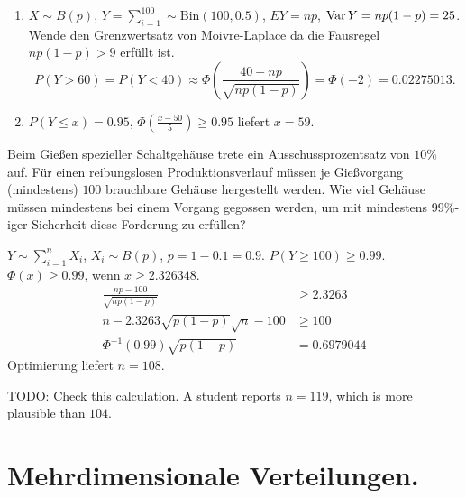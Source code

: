 \solution 
\begin{enumerate}
    \item $X\sim B(p)$, $Y=\sum_{i=1}^{100} \sim \text{Bin}(100,0.5)$, $E Y =
        np$, $\operatorname{Var} Y = np(1-p)= 25$. Wende den Grenzwertsatz von Moivre-Laplace
        da die Fausregel $np(1-p)>9$ erfüllt ist.
        \begin{equation*}
            P(Y>60) = P(Y < 40) \approx 
            \Phi\left( \frac{40 - np}{ \sqrt{np(1-p)}} \right) =
            \Phi(-2) = 0.02275013.
        \end{equation*}

    \item $P(Y \leq x) = 0.95$, $\Phi\left( \frac{x-50}{5} \right) \geq 0.95$
        liefert $x=59$. 
\end{enumerate}

 Beim Gießen spezieller
Schaltgehäuse trete ein Ausschussprozentsatz von $10\%$ auf. Für einen
reibungslosen Produktionsverlauf müssen je Gießvorgang (mindestens) $100$
brauchbare Gehäuse hergestellt werden.  Wie viel Gehäuse müssen mindestens bei
einem Vorgang gegossen werden, um mit mindestens $99\%$-iger Sicherheit diese
Forderung zu erfüllen?

\solution $Y\sim \sum_{i=1}^{n} X_i$, $X_i \sim B(p)$,
$p=1-0.1=0.9$.  $P(Y\geq 100) \geq 0.99$. $\Phi(x) \geq 0.99$, wenn $x\geq
2.326348$. 
\begin{align*}
    \frac{np - 100}{ \sqrt{np(1-p)} } &\geq 2.3263 \\
    n - 2.3263 \sqrt{p(1-p)} \sqrt{n} -100 &\geq 100 \\
    \Phi^{-1}(0.99) \sqrt{p(1-p)} &= 0.6979044
\end{align*}
Optimierung liefert $n=108$.

TODO: Check this calculation. A student reports $n=119$, which is more
plausible than $104$. 


\section{Mehrdimensionale Verteilungen.}

